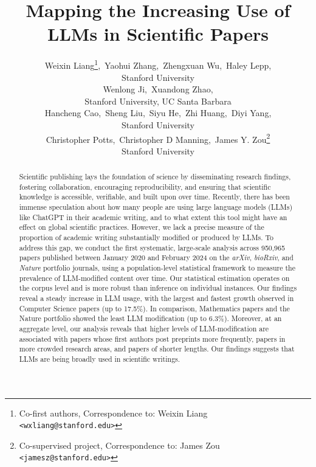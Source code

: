\documentclass{article}
\title{
Mapping the Increasing Use of LLMs in Scientific Papers
}
\author{Weixin Liang\thanks{Co-first authors, Correspondence to: Weixin Liang \texttt{<wxliang@stanford.edu>}},\, 
Yaohui Zhang\footnotemark[1],\,  Zhengxuan Wu\footnotemark[1],\, Haley Lepp,\\
Stanford University\\
\AND 
Wenlong Ji,\, Xuandong Zhao,\\
Stanford University, UC Santa Barbara\\
\AND 
Hancheng Cao,\, Sheng Liu,\, Siyu He,\, Zhi Huang,\, Diyi Yang, \\
Stanford University\\
\AND
Christopher Potts\footnotemark[2],\, Christopher D Manning\footnotemark[2],\, James Y. Zou\thanks{Co-supervised project, Correspondence to: James Zou \texttt{<jamesz@stanford.edu>}} \\
Stanford University\\
}
\begin{document}
\maketitle

\begin{abstract}







Scientific publishing lays the foundation of science by disseminating research findings, fostering collaboration, encouraging reproducibility, and ensuring that scientific knowledge is accessible, verifiable, and built upon over time. Recently, there has been immense speculation about how many people are using large language models (LLMs) like ChatGPT in their academic writing, and to what extent this tool might have an effect on global scientific practices. However, we lack a precise measure of the proportion of academic writing substantially modified or produced by LLMs. 
To address this gap, we conduct the first systematic, large-scale analysis across 950,965 papers published between January 2020 and February 2024 on the \textit{arXiv}, \textit{bioRxiv}, and \textit{Nature} portfolio journals, using a population-level statistical framework to measure the prevalence of LLM-modified content over time. Our statistical estimation operates on the corpus level and is more robust than inference on  individual instances. Our findings reveal a steady increase in LLM usage, with the largest and fastest growth observed in Computer Science papers (up to 17.5\%). In comparison, Mathematics papers and the Nature portfolio showed the least LLM modification (up to 6.3\%). Moreover, at an aggregate level, our analysis reveals that higher levels of LLM-modification are associated with papers whose first authors post preprints more frequently, papers in more crowded research areas, and papers of shorter lengths. Our findings suggests that LLMs are being broadly used in scientific writings. 





 

\end{abstract}
\end{document}
